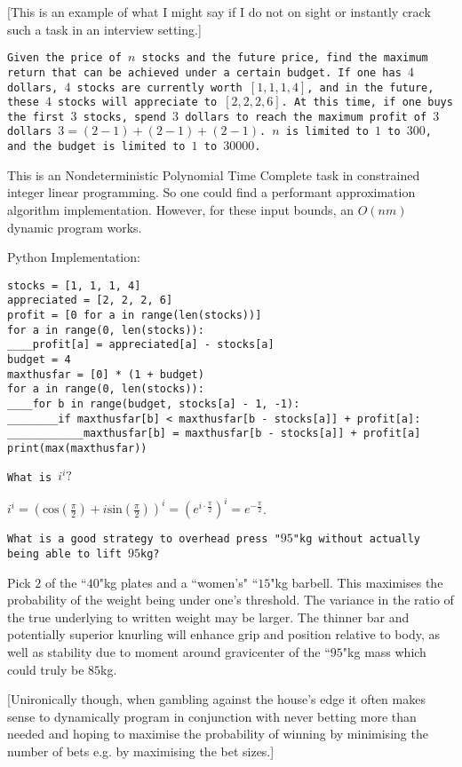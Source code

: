 [This is an example of what I might say if I do not on sight or instantly crack such a task in an interview setting.]

\texttt{Given the price of $n$ stocks and the future price, find the maximum return that can be achieved under a certain budget. If one has $4$ dollars, $4$ stocks are currently worth $[1,1,1,4]$, and in the future, these $4$ stocks will appreciate to $[2,2,2,6]$. At this time, if one buys the first $3$ stocks, spend $3$ dollars to reach the maximum profit of $3$ dollars $3=(2-1)+(2-1)+(2-1)$. $n$ is limited to $1$ to $300$, and the budget is limited to $1$ to $30000$.}

This is an Nondeterministic Polynomial Time Complete task in constrained integer linear programming. So one could find a performant approximation algorithm implementation. However, for these input bounds, an $O(nm)$ dynamic program works.

Python Implementation:

\begin{verbatim}
stocks = [1, 1, 1, 4]
appreciated = [2, 2, 2, 6]
profit = [0 for a in range(len(stocks))]
for a in range(0, len(stocks)):
____profit[a] = appreciated[a] - stocks[a]
budget = 4
maxthusfar = [0] * (1 + budget)
for a in range(0, len(stocks)):
____for b in range(budget, stocks[a] - 1, -1):
________if maxthusfar[b] < maxthusfar[b - stocks[a]] + profit[a]:
____________maxthusfar[b] = maxthusfar[b - stocks[a]] + profit[a]
print(max(maxthusfar))
\end{verbatim}

\texttt{What is $i^i?$}

$i^i = \left ( \text{cos}\left( \frac{\pi}{2} \right)+i \text{sin}\left( \frac{\pi}{2} \right) \right )^i = \left ( e^{i \cdot \frac{\pi}{2}} \right )^i = \boxed{e^{-\frac{\pi}{2}}}$.

\texttt{What is a good strategy to overhead press "$95$"kg without actually being able to lift $95$kg?}

Pick $2$ of the ``$40$"kg plates and a ``women's" ``$15$"kg barbell. This maximises the probability of the weight being under one's threshold. The variance in the ratio of the true underlying to written weight may be larger. The thinner bar and potentially superior knurling will enhance grip and position relative to body, as well as stability due to moment around gravicenter of the ``$95$"kg mass which could truly be $85$kg.

[Unironically though, when gambling against the house's edge it often makes sense to dynamically program in conjunction with never betting more than needed and hoping to maximise the probability of winning by minimising the number of bets e.g. by maximising the bet sizes.]

